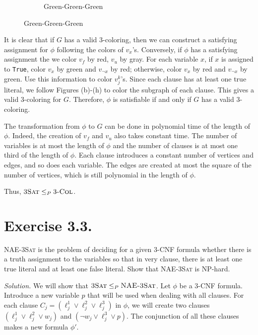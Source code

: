 \begin{enumerate}
\begin{figure}[ht]
\begin{subfigure}{0.45\textwidth}
            \caption{Green-Green-Green}
          \end{subfigure}
        \end{figure}
\end{enumerate}

It is clear that if $G$ has a valid $3$-coloring, then we can construct a satisfying assignment for $\phi$ following the colors of $v_x$'s. Conversely, if $\phi$ has a satisfying assignment the we color $v_f$ by red, $v_u$ by gray. For each variable $x$, if $x$ is assigned to \texttt{True}, color $v_x$ by green and $v_{\neg x}$ by red; otherwise, color $v_x$ by red and $v_{\neg x}$ by green. Use this information to color $v_j^k$'s. Since each clause has at least one true literal, we follow Figures (b)-(h) to color the subgraph of each clause. This gives a valid $3$-coloring for $G$. Therefore, $\phi$ is satisfiable if and only if $G$ has a valid $3$-coloring.

The transformation from $\phi$ to $G$ can be done in polynomial time of the length of $\phi$. Indeed, the creation of $v_f$ and $v_u$ also takes constant time. The number of variables is at most the length of $\phi$ and the number of clauses is at most one third of the length of $\phi$. Each clause introduces a constant number of vertices and edges, and so does each variable. The edges are created at most the square of the number of vertices, which is still polynomial in the length of $\phi$.

Thus, $\textsc{3Sat}\le_P \textsc{$3$-Col}$.

\section{Exercise 3.3.} \textsc{NAE-3Sat} is the problem of deciding for a given $3$-CNF formula whether there is a truth assignment to the variables so that in very clause, there is at least one true literal and at least one false literal. Show that \textsc{NAE-3Sat} is NP-hard.

\textit{Solution.} We will show that $\textsc{3Sat}\le_P \textsc{NAE-3Sat}$. Let $\phi$ be a $3$-CNF formula. Introduce a new variable $p$ that will be used when dealing with all clauses. For each clause $C_j=(\ell_{j}^{1}\vee \ell_{j}^{2}\vee \ell_{j}^{3})$ in $\phi$, we will create two clauses $(\ell_{j}^{1}\vee \ell_{j}^{2}\vee w_j)$ and $(\neg w_j \vee \ell_{j}^{3}\vee p)$. The conjunction of all these clauses makes a new formula $\phi'$.

